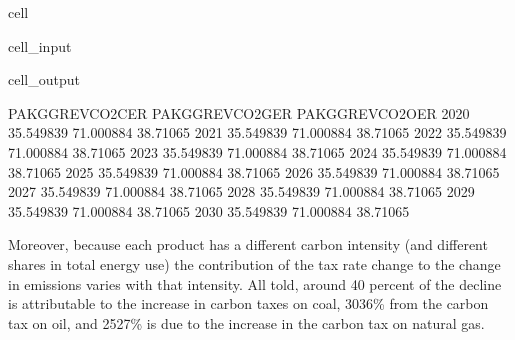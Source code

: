 \documentclass[letterpaper,10pt,english]{jupyterBook}
\begin{document}
\begin{sphinxuseclass}{cell}\begin{sphinxVerbatimInput}

\begin{sphinxuseclass}{cell_input}
\begin{sphinxVerbatim}[commandchars=\\\{\}]
 
    \PYG{p}{[}\PYG{p}{]}
\end{sphinxVerbatim}

\end{sphinxuseclass}\end{sphinxVerbatimInput}
\begin{sphinxVerbatimOutput}

\begin{sphinxuseclass}{cell_output}
\begin{sphinxVerbatim}[commandchars=\\\{\}]
      PAKGGREVCO2CER  PAKGGREVCO2GER  PAKGGREVCO2OER
2020       35.549839       71.000884        38.71065
2021       35.549839       71.000884        38.71065
2022       35.549839       71.000884        38.71065
2023       35.549839       71.000884        38.71065
2024       35.549839       71.000884        38.71065
2025       35.549839       71.000884        38.71065
2026       35.549839       71.000884        38.71065
2027       35.549839       71.000884        38.71065
2028       35.549839       71.000884        38.71065
2029       35.549839       71.000884        38.71065
2030       35.549839       71.000884        38.71065
\end{sphinxVerbatim}

\end{sphinxuseclass}\end{sphinxVerbatimOutput}

\end{sphinxuseclass}
\sphinxAtStartPar
Moreover, because each product has a different carbon intensity (and different shares in total energy use) the contribution of the tax rate change to the change in emissions varies with that intensity. All told, around 40 percent of the decline is attributable to the increase in carbon taxes on coal, 30\sphinxhyphen{}36\% from the carbon tax on oil, and 25\sphinxhyphen{}27\% is due to the increase in the carbon tax on natural gas.
\end{document}
